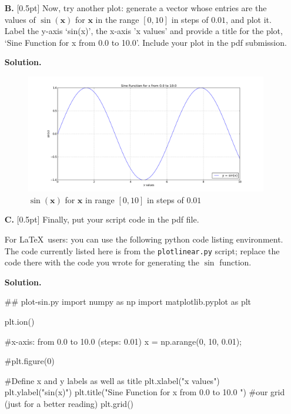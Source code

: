 \documentclass[10pt]{article}
\begin{document}
\begin{enumerate}
\begin{itemize}
\item[{\bf B.}] [0.5pt] Now, try another plot: generate a vector whose entries are the values of $\sin(\mathbf{x})$ for $\mathbf{x}$ in the range $[0,10]$ in steps of $0.01$, and plot it.  Label the y-axis `sin(x)', the x-axis 'x values' and provide a title for the plot, `Sine Function for x from 0.0 to 10.0'.  Include your plot in the pdf submission.

{\bf Solution.}
\begin{figure}[htb]
\begin{center}
\includegraphics[width=14cm]{figs/sinx.png}
\caption{$\sin(\mathbf{x})$ for $\mathbf{x}$ in range $[0,10]$ in steps of $0.01$}
\end{center}
\end{figure}


\newpage

\item[{\bf C.}] [0.5pt] Finally, put your script code in the pdf file.  

For \LaTeX~users: you can use the following python code listing environment.  The code currently listed here is from the {\tt plotlinear.py} script; replace the code there with the code you wrote for generating the $\sin$ function.

{\bf Solution.}

\begin{python}[caption={ {\tt plot-sin.py} script}, label=Sine Function for x from 0.0 to 10.0]
## plot-sin.py
import numpy as np
import matplotlib.pyplot as plt

plt.ion()

#x-axis: from 0.0 to 10.0 (steps: 0.01)
x = np.arange(0, 10, 0.01);

#plt.figure(0)

#Define x and y labels as well as title
plt.xlabel("x values")
plt.ylabel("sin(x)")
plt.title("Sine Function for x from 0.0 to 10.0 ")
#our grid (just for a better reading)
plt.grid()


\end{python}
\end{itemize}
\end{enumerate}
\end{document}
